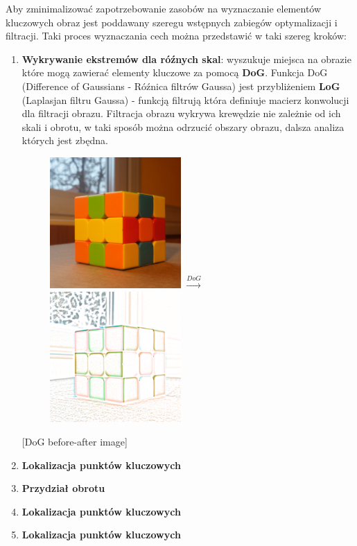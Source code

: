 Aby zminimalizować zapotrzebowanie zasobów na wyznaczanie elementów kluczowych obraz jest poddawany szeregu wstępnych zabiegów optymalizacji i filtracji. Taki proces wyznaczania cech można przedstawić w taki szereg kroków:
\begin{enumerate}
   \item \textbf{Wykrywanie ekstremów dla róźnych skal}:
      wyszukuje miejsca na obrazie które mogą zawierać elementy kluczowe za pomocą \textbf{DoG}. Funkcja DoG (Difference of Gaussians - Róźnica filtrów Gaussa) jest przybliżeniem \textbf{LoG} (Laplasjan filtru Gaussa) - funkcją filtrują która definiuje macierz konwolucji dla filtracji obrazu. Filtracja obrazu wykrywa krewędzie nie zależnie od ich skali i obrotu, w taki sposób można odrzucić obszary obrazu, dalsza analiza których jest zbędna.

      \begin{figure}[h!]
         \centering
         \includegraphics[width=5cm]{DoG_orgin.png}
         {\Large $  \xrightarrow{DoG}  $} \vspace{2cm}
         \includegraphics[width=5cm]{DoG_F_white.png}
      \end{figure}

      [DoG before-after image]

   \item \textbf{Lokalizacja punktów kluczowych}

   \item \textbf{Przydział obrotu}

   \item \textbf{Lokalizacja punktów kluczowych}

   \item \textbf{Lokalizacja punktów kluczowych}
\end{enumerate}



